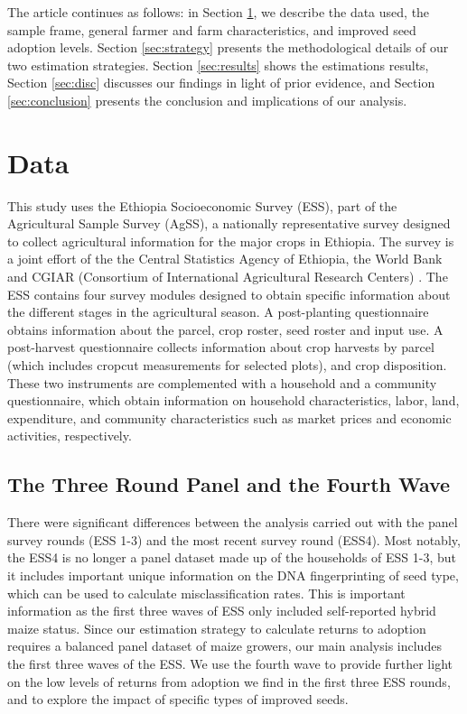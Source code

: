 \documentclass[11pt]{article}
\begin{document}
The article continues as follows: in Section \ref{sec:data}, we describe the data used, the sample frame, general farmer and farm characteristics, and improved seed adoption levels. Section \ref{sec:strategy} presents the methodological details of our two estimation strategies. Section \ref{sec:results} shows the estimations results, Section \ref{sec:disc} discusses our findings in light of prior evidence, and Section \ref{sec:conclusion} presents the conclusion and implications of our analysis.


\section{Data}\label{sec:data}

This study uses the Ethiopia Socioeconomic Survey (ESS), part of the Agricultural Sample Survey (AgSS), a nationally representative survey designed to collect agricultural information for the major crops in Ethiopia. The survey is a joint effort of the the Central Statistics Agency of Ethiopia, the World Bank and CGIAR (Consortium of International Agricultural Research Centers) \citep{kosmowski2020shining}. The ESS contains four survey modules designed to obtain specific information about the different stages in the agricultural season. A post-planting questionnaire obtains information about the parcel, crop roster, seed roster and input use. A post-harvest questionnaire collects information about crop harvests by parcel (which includes cropcut measurements for selected plots), and crop disposition. These two instruments are complemented with a household and a community questionnaire, which obtain information on household characteristics, labor, land, expenditure, and community characteristics such as market prices and economic activities, respectively.

\subsection{The Three Round Panel and the Fourth Wave}

There were significant differences between the analysis carried out with the panel survey rounds (ESS 1-3) and the most recent survey round (ESS4). Most notably, the ESS4 is no longer a panel dataset made up of the households of ESS 1-3, but it includes important unique information on the DNA fingerprinting of seed type, which can be used to calculate misclassification rates. This is important information as the first three waves of ESS only included self-reported hybrid maize status. Since our estimation strategy to calculate returns to adoption requires a balanced panel dataset of maize growers, our main analysis includes the first three waves of the ESS. We use the fourth wave to provide further light on the low levels of returns from adoption we find in the first three ESS rounds, and to explore the impact of specific types of improved seeds.
\end{document}
